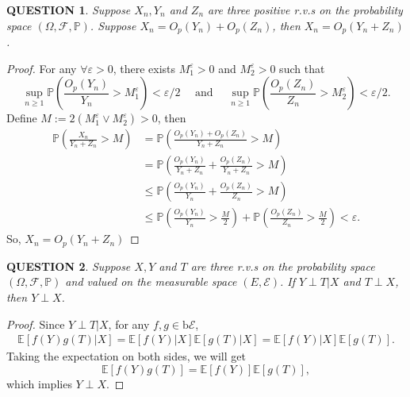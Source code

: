 \documentclass[12pt]{article}
\renewcommand{\(}{\left(}%
\renewcommand{\)}{\right)}%
\renewcommand{\[}{\left[}%
\renewcommand{\]}{\right]}%
\newcommand{\p}{\mathbb{P}}
\newcommand{\f}{\mathscr{F}}
\newcommand{\e}{\mathscr{E}}
\newtheorem{question}{QUESTION}[section]}
\newtheorem{proof}{Proof.}}
\begin{document}
	\begin{question}
		Suppose $X_n,Y_n$ and $Z_n$ are three positive r.v.s on the probability space $(\Omega,\f,\p)$. Suppose $X_n=O_p(Y_n)+O_p(Z_n)$, then $X_n=O_p(Y_n+Z_n)$.
	\end{question}
	\begin{proof}
		For any $\forall \varepsilon>0$, there exists $M_1^\varepsilon>0$ and $M_2^\varepsilon>0$ such that
		\begin{equation*}
			\sup_{n\geq 1}\p\(\frac{O_p(Y_n)}{Y_n}> M_1^\varepsilon \)<\varepsilon/2\quad \text{ and }\quad \sup_{n\geq 1}\p\(\frac{O_p(Z_n)}{Z_n}> M_2^\varepsilon \)<\varepsilon/2.
		\end{equation*}
		Define $M:=2(M_1^\varepsilon\vee M_2^\varepsilon)>0$, then
		\begin{equation*}
			\begin{split}
				\p\(\frac{X_n}{Y_n+Z_n} >M\)&=\p\(\frac{O_p(Y_n)+O_p(Z_n)}{Y_n+Z_n} >M\)\\
				&=\p\(\frac{O_p(Y_n)}{Y_n+Z_n}+\frac{O_p(Z_n)}{Y_n+Z_n} >M\)\\
				&\leq \p\(\frac{O_p(Y_n)}{Y_n}+\frac{O_p(Z_n)}{Z_n} >M\)\\
				&\leq \p\(\frac{O_p(Y_n)}{Y_n}>\frac{M}{2}\)+\p\(\frac{O_p(Z_n)}{Z_n}>\frac{M}{2}\)<\varepsilon.
			\end{split}
		\end{equation*}
		So, $X_n=O_p(Y_n+Z_n)$
	\end{proof}
	
	\begin{question}
		Suppose $X,Y$ and $T$ are three r.v.s on the probability space $(\Omega,\f,\p)$ and valued on the measurable space $(E,\e)$. If $Y\perp T|X$ and $T\perp X$, then $Y\perp X$.
	\end{question}
	\begin{proof}
		Since $Y\perp T|X$, for any $f,g\in \mathrm{b}\e$,
		\begin{equation*}
			\begin{split}
				\mathbb{E}[f(Y)g(T)|X]=\mathbb{E}[f(Y)|X]\mathbb{E}[g(T)|X]=\mathbb{E}[f(Y)|X]\mathbb{E}[g(T)].
			\end{split}
		\end{equation*}
		Taking the expectation on both sides, we will get
		\begin{equation*}
			\mathbb{E}[f(Y)g(T)]=\mathbb{E}[f(Y)]\mathbb{E}[g(T)],
		\end{equation*}
		which implies $Y\perp X$.
	\end{proof}
	
\end{document}
